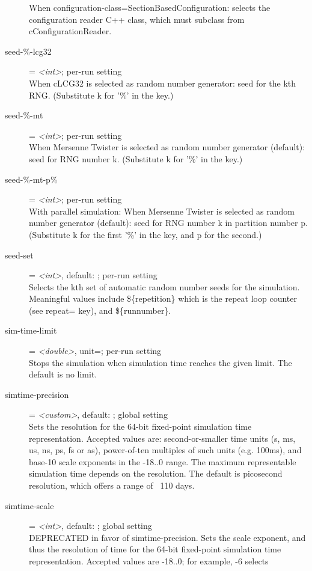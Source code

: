 \begin{description}
    When configuration-class=SectionBasedConfiguration: selects the
    configuration reader C++ class, which must subclass from
    cConfigurationReader.
\item[seed-\%-lcg32] = \textit{<int>}; per-run setting \\
    When cLCG32 is selected as random number generator: seed for the kth RNG.
    (Substitute k for '\%' in the key.)
\item[seed-\%-mt] = \textit{<int>}; per-run setting \\
    When Mersenne Twister is selected as random number generator (default):
    seed for RNG number k. (Substitute k for '\%' in the key.)
\item[seed-\%-mt-p\%] = \textit{<int>}; per-run setting \\
    With parallel simulation: When Mersenne Twister is selected as random
    number generator (default): seed for RNG number k in partition number p.
    (Substitute k for the first '\%' in the key, and p for the second.)
\item[seed-set] = \textit{<int>}, default: ; per-run setting \\
    Selects the kth set of automatic random number seeds for the simulation.
    Meaningful values include \$\{repetition\} which is the repeat loop counter
    (see repeat= key), and \$\{runnumber\}.
\item[sim-time-limit] = \textit{<double>}, unit=; per-run setting \\
    Stops the simulation when simulation time reaches the given limit. The
    default is no limit.
\item[simtime-precision] = \textit{<custom>}, default: ; global setting \\
    Sets the resolution for the 64-bit fixed-point simulation time
    representation. Accepted values are: second-or-smaller time units (s, ms,
    us, ns, ps, fs or as), power-of-ten multiples of such units (e.g. 100ms),
    and base-10 scale exponents in the -18..0 range. The maximum representable
    simulation time depends on the resolution. The default is picosecond
    resolution, which offers a range of ~110 days.
\item[simtime-scale] = \textit{<int>}, default: ; global setting \\
    DEPRECATED in favor of simtime-precision. Sets the scale exponent, and thus
    the resolution of time for the 64-bit fixed-point simulation time
    representation. Accepted values are -18..0; for example, -6 selects

\end{description}
